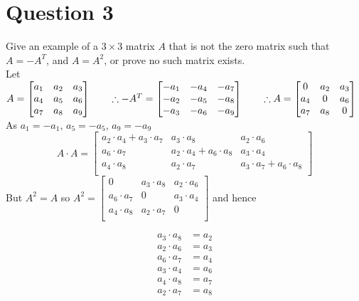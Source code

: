\documentclass[12pt]{article}
\begin{document}
\section*{Question 3}
Give an example of a $3 \times 3$ matrix $A$ that is not the zero matrix such that $A=-A^T$, and $A=A^2$, or prove no such matrix exists.\\
Let $
A = 
\begin{bmatrix}
   a_1 & a_2 & a_3 \\
   a_4 & a_5 & a_6 \\
   a_7 & a_8 & a_9 \\
\end{bmatrix}
\hspace{20px}
\therefore
-A^T = 
\begin{bmatrix}
   -a_1 & -a_4 & -a_7 \\
   -a_2 & -a_5 & -a_8 \\
   -a_3 & -a_6 & -a_9 \\
\end{bmatrix}
\hspace{20px}
\therefore
A = 
\begin{bmatrix}
    0 & a_2 & a_3 \\
   a_4 & 0 & a_6 \\
   a_7 & a_8 & 0 \\
\end{bmatrix}
$ \\
As $a_1=-a_1$, $a_5=-a_5$, $a_9=-a_9$
$$
A\cdot A=
\begin{bmatrix}
   a_2\cdot a_4 + a_3\cdot a_7  & a_3\cdot a_8 & a_2\cdot a_6 \\
   a_6\cdot a_7 & a_2\cdot a_4 + a_6\cdot a_8 & a_3\cdot a_4 \\
   a_4\cdot a_8 & a_2\cdot a_7 & a_3\cdot a_7 + a_6\cdot a_8 \\
\end{bmatrix}
$$
But $A^2=A$ so 
$
A^2=
\begin{bmatrix}
   0 & a_3\cdot a_8 & a_2\cdot a_6 \\
   a_6\cdot a_7 & 0 & a_3\cdot a_4 \\
   a_4\cdot a_8 & a_2\cdot a_7 & 0 \\
\end{bmatrix}
$
and hence

\begin{align} 
a_3\cdot a_8 &= a_2 \\
a_2\cdot a_6 &= a_3 \\
a_6\cdot a_7 &= a_4 \\ 
a_3\cdot a_4 &= a_6 \\
a_4\cdot a_8 &= a_7 \\
a_2\cdot a_7 &= a_8 \\
\end{align}
\end{document}
